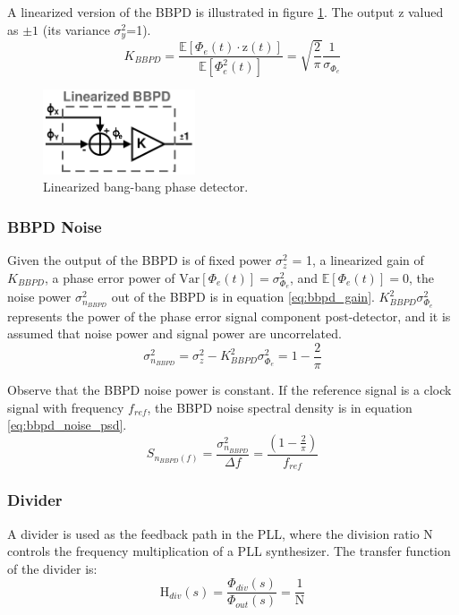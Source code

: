 			A linearized version of the BBPD is illustrated in figure \ref{fig:bbpd_linearized}. The output $\mathrm{z}$ valued as $\pm 1$ (its variance $\sigma_y^2$=1).
			\begin{equation}\label{eq:nom_bbpd_gain}
				K_{BBPD} = \frac{\mathbb{E}[\Phi_e(t)\cdot\mathrm{z}(t)]}{\mathbb{E}[\Phi_e^2(t)]} = \sqrt{\frac{2}{\pi}}\frac{1}{\sigma_{\Phi_e}}
			\end{equation}
			\begin{figure}[htb!]
				\center\includegraphics[width=0.4\textwidth, angle=0]{./figs/theory/bbpd_linearized}
				\caption{Linearized bang-bang phase detector.}
				\label{fig:bbpd_linearized}
			\end{figure}

			\subsubsection{BBPD Noise}\label{sec:bbpd_noise}
			Given the output of the BBPD is of fixed power $\sigma_z^2$ = 1, a linearized gain of $K_{BBPD}$, a phase error power of $\mathrm{Var}[\Phi_e(t)] = \sigma_{\Phi_e}^2$, and $\mathbb{E}[\Phi_e(t)]=0$, the noise power  $\sigma_{n_{BBPD}}^2$ out of the BBPD is in equation \ref{eq:bbpd_gain}. $K_{BBPD}^2\sigma_{\Phi_e}^2$ represents the power of the phase error signal component post-detector, and it is assumed that noise power and signal power are uncorrelated.
			\begin{equation}\label{eq:bbpd_gain}
				\sigma_{n_{BBPD}}^2 = \sigma_z^2 - K_{BBPD}^2\sigma_{\Phi_e}^2 = 1-\frac{2}{\pi}
			\end{equation}


			Observe that the BBPD noise power is constant. If the reference signal is a clock signal with frequency $f_{ref}$, the BBPD noise spectral density is in equation \ref{eq:bbpd_noise_psd}.
			\begin{equation}\label{eq:bbpd_noise_psd}
				S_{ n_{BBPD}(f)} = \frac{\sigma_{n_{BBPD}}^2}{\Delta f} = \frac{\left(1-\frac{2}{\pi}\right)}{f_{ref}}
			\end{equation}



		\subsubsection{Divider}
			A divider is used as the feedback path in the PLL, where the division ratio N controls the frequency multiplication of a PLL synthesizer. The transfer function of the divider is:
			\begin{equation}
				\mathrm{H}_{div}(s) = \frac{\Phi_{div}(s)}{\Phi_{out}(s)} = \frac{1}{\mathrm{N}}
			\end{equation}


